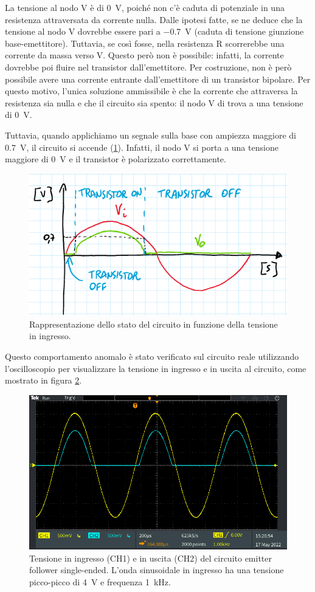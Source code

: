 \noindent
La tensione al nodo V è di \SI{0}{\volt}, poiché non c'è caduta di potenziale in una resistenza attraversata da corrente nulla. Dalle ipotesi fatte, se ne deduce che la tensione al nodo V dovrebbe essere pari a \SI{-0.7}{\volt} (caduta di tensione giunzione base-emettitore). Tuttavia, se così fosse, nella resistenza R scorrerebbe una corrente da massa verso V. Questo però non è possibile: infatti, la corrente dovrebbe poi fluire nel transistor dall'emettitore. Per costruzione, non è però possibile avere una corrente entrante dall'emettitore di un transistor bipolare. Per questo motivo, l'unica soluzione ammissibile è che la corrente che attraversa la resistenza sia nulla e che il circuito sia spento: il nodo V di trova a una tensione di \SI{0}{\volt}. 

\noindent
Tuttavia, quando applichiamo un segnale sulla base con ampiezza maggiore di \SI{0.7}{\volt}, il circuito si accende (\Fig\ref{fig:emitterfollwer_se_statocircuito}). Infatti, il nodo V si porta a una tensione maggiore di \SI{0}{\volt} e il transistor è polarizzato correttamente.
\begin{figure}[h!]
	\centering
	\includegraphics[width=0.7\linewidth]{./ImageFiles/Laboratorio 2/emitter follower errore soglia}
	\caption{Rappresentazione dello stato del circuito in funzione della tensione in ingresso.}
	\label{fig:emitterfollwer_se_statocircuito}
\end{figure}

\noindent
Questo comportamento anomalo è stato verificato sul circuito reale utilizzando l'oscilloscopio per visualizzare la tensione in ingresso e in uscita al circuito, come mostrato in figura \ref{fig:emitterfollwer_se_errore}.
\begin{figure}[h!]
	\centering
	\includegraphics[width=0.7\linewidth]{./ImageFiles/Laboratorio 2/TEK00020}
	\caption{Tensione in ingresso (CH1) e in uscita (CH2) del circuito emitter follower single-ended. L'onda sinusoidale in ingresso ha una tensione picco-picco di \SI{4}{\volt} e frequenza \SI{1}{\kilo\hertz}.}
	\label{fig:emitterfollwer_se_errore}
\end{figure}

